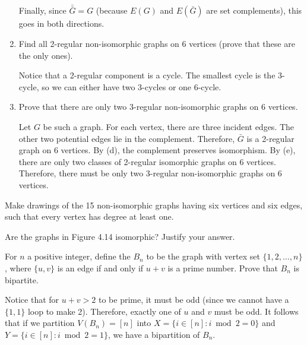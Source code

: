 \documentclass[class=math239,notes,tikz]{agony}
\begin{document}
\begin{enumerate}
\begin{prf}
          Finally, since $\bar{\bar G} = G$ (because $E(G)$ and $E(\bar G)$ are set complements),
          this goes in both directions.
        \end{prf}
  \item Find all 2-regular non-isomorphic graphs on 6 vertices
        (prove that these are the only ones).
        \begin{prf}
          Notice that a 2-regular component is a cycle.
          The smallest cycle is the 3-cycle,
          so we can either have two 3-cycles or one 6-cycle.
        \end{prf}
  \item Prove that there are only two 3-regular non-isomorphic graphs on 6 vertices.
        \begin{prf}
          Let $G$ be such a graph.
          For each vertex, there are three incident edges.
          The other two potential edges lie in the complement.
          Therefore, $\bar G$ is a 2-regular graph on 6 vertices.
          By (d), the complement preserves isomorphism.
          By (e), there are only two classes of 2-regular isomorphic graphs on 6 vertices.
          Therefore, there must be only two 3-regular non-isomorphic graphs on 6 vertices.
        \end{prf}
\end{enumerate}

\begin{xca}
  Make drawings of the 15 non-isomorphic graphs having six vertices and six edges,
  such that every vertex has degree at least one.
\end{xca}

\begin{xca}
  Are the graphs in Figure 4.14 isomorphic? Justify your answer.
\end{xca}

\begin{xca}\label{xca:prime}
  For $n$ a positive integer, define the  $B_n$
  to be the graph with vertex set $\{1,2,\dotsc,n\}$,
  where $\{u,v\}$ is an edge if and only if $u + v$ is a prime number.
  Prove that $B_n$ is bipartite.
\end{xca}
\begin{prf}
  Notice that for $u+v > 2$ to be prime, it must be odd
  (since we cannot have a $\{1,1\}$ loop to make 2).
  Therefore, exactly one of $u$ and $v$ must be odd.
  It follows that if we partition $V(B_n) = [n]$
  into $X = \{ i \in [n] : i \bmod 2 = 0 \}$ and $Y = \{ i \in [n] : i \bmod 2 = 1 \}$,
  we have a bipartition of $B_n$.
\end{prf}
\end{document}
